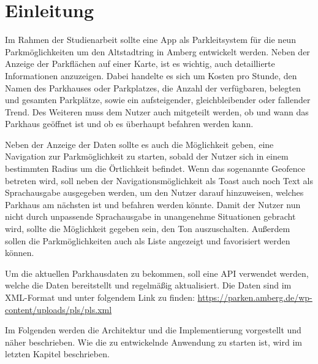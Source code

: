 \chapter{Einleitung}

Im Rahmen der Studienarbeit sollte eine App als Parkleitsystem für die neun Parkmöglichkeiten um den Altstadtring in Amberg entwickelt werden. Neben der Anzeige der Parkflächen auf einer Karte, ist es wichtig, auch detaillierte Informationen anzuzeigen. Dabei handelte es sich um Kosten pro Stunde, den Namen des Parkhauses oder Parkplatzes, die Anzahl der verfügbaren, belegten und gesamten Parkplätze, sowie ein aufsteigender, gleichbleibender oder fallender Trend. Des Weiteren muss dem Nutzer auch mitgeteilt werden, ob und wann das Parkhaus geöffnet ist und ob es überhaupt befahren werden kann.

Neben der Anzeige der Daten sollte es auch die Möglichkeit geben, eine Navigation zur Parkmöglichkeit zu starten, sobald der Nutzer sich in einem bestimmten Radius um die Örtlichkeit befindet. Wenn das sogenannte Geofence betreten wird, soll neben der Navigationsmöglichkeit als Toast auch noch Text als Sprachausgabe ausgegeben werden, um den Nutzer darauf hinzuweisen, welches Parkhaus am nächsten ist und befahren werden könnte. Damit der Nutzer nun nicht durch unpassende Sprachausgabe in unangenehme Situationen gebracht wird, sollte die Möglichkeit gegeben sein, den Ton auszuschalten. Außerdem sollen die Parkmöglichkeiten auch als Liste angezeigt und favorisiert werden können.

Um die aktuellen Parkhausdaten zu bekommen, soll eine API verwendet werden, welche die Daten bereitstellt und regelmäßig aktualisiert. Die Daten sind im XML-Format und unter folgendem Link zu finden: \url{https://parken.amberg.de/wp-content/uploads/pls/pls.xml}

Im Folgenden werden die Architektur und die Implementierung vorgestellt und näher beschrieben. Wie die zu entwickelnde Anwendung zu starten ist, wird im letzten Kapitel beschrieben.